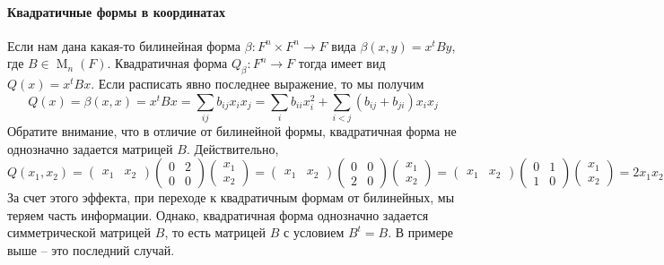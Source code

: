 \paragraph{Квадратичные формы в координатах}


Если нам дана какая-то билинейная форма $\beta \colon F^n\times F^n\to F$ вида $\beta(x, y) = x^t B y$, где $B\in \operatorname{M}_n(F)$. Квадратичная форма $Q_\beta\colon F^n\to F$ тогда имеет вид $Q(x) = x^t B x$. Если расписать явно последнее выражение, то мы получим
\[
Q(x) = \beta(x,x) = x^t B x = \sum_{ij} b_{ij}x_ix_j = \sum_{i}b_{ii}x_i^2+ \sum_{i<j}(b_{ij} + b_{ji})x_i x_j
\]
Обратите внимание, что в отличие от билинейной формы, квадратичная форма не однозначно задается матрицей $B$. Действительно, 
\[
Q(x_1,x_2) = 
\begin{pmatrix}
{x_1}&{x_2}
\end{pmatrix}
\begin{pmatrix}
{0}&{2}\\
{0}&{0}
\end{pmatrix}
\begin{pmatrix}
{x_1}\\{x_2}
\end{pmatrix}=
\begin{pmatrix}
{x_1}&{x_2}
\end{pmatrix}
\begin{pmatrix}
{0}&{0}\\
{2}&{0}
\end{pmatrix}
\begin{pmatrix}
{x_1}\\{x_2}
\end{pmatrix}=
\begin{pmatrix}
{x_1}&{x_2}
\end{pmatrix}
\begin{pmatrix}
{0}&{1}\\
{1}&{0}
\end{pmatrix}
\begin{pmatrix}
{x_1}\\{x_2}
\end{pmatrix}
=2x_1x_2
\]
За счет этого эффекта, при переходе к квадратичным формам от билинейных, мы теряем часть информации. Однако, квадратичная форма однозначно задается симметрической матрицей $B$, то есть матрицей $B$ с условием $B^t = B$. В примере выше -- это последний случай.



